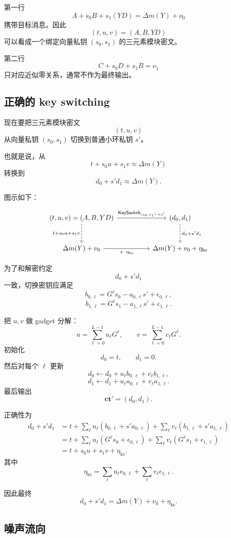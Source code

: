 \documentclass[11pt]{article}
\newcommand{\ct}{\mathbf{ct}}
\newcommand{\KS}{\mathsf{KeySwitch}}
\begin{document}
第一行
\[
A+s_0B+s_1(YD)=\Delta m(Y)+\nu_0
\]
携带目标消息。因此
\[
(t,u,v)=(A,B,YD)
\]
可以看成一个绑定向量私钥 $(s_0,s_1)$ 的三元素模块密文。

第二行
\[
C+s_0D+s_1B=\nu_1
\]
只对应近似零关系，通常不作为最终输出。

\subsection{正确的 key switching}

现在要把三元素模块密文
\[
(t,u,v)
\]
从向量私钥 $(s_0,s_1)$ 切换到普通小环私钥 $s'$。

也就是说，从
\[
t+s_0u+s_1v\approx \Delta m(Y)
\]
转换到
\[
d_0+s'd_1\approx \Delta m(Y).
\]

图示如下：

\[
\begin{tikzcd}[column sep=huge,row sep=large]
(t,u,v)=(A,B,YD)
  \arrow[d,dashed,"t+s_0u+s_1v"']
  \arrow[r,"\KS_{(s_0,s_1)\to s'}"]
&
(d_0,d_1)
  \arrow[d,dashed,"d_0+s'd_1"]
\\
\Delta m(Y)+\nu_0
  \arrow[r,"+\ \eta_{\mathrm{ks}}"']
&
\Delta m(Y)+\nu_0+\eta_{\mathrm{ks}}
\end{tikzcd}
\]

为了和解密约定
\[
d_0+s'd_1
\]
一致，切换密钥应满足
\[
b_{0,\ell}=G^\ell s_0-a_{0,\ell}s'+\epsilon_{0,\ell},
\]
\[
b_{1,\ell}=G^\ell s_1-a_{1,\ell}s'+\epsilon_{1,\ell}.
\]

把 $u,v$ 做 gadget 分解：
\[
u=\sum_{\ell=0}^{L-1}u_\ell G^\ell,
\qquad
v=\sum_{\ell=0}^{L-1}v_\ell G^\ell.
\]
初始化
\[
d_0=t,
\qquad
d_1=0.
\]
然后对每个 $\ell$ 更新
\[
d_0\leftarrow d_0+u_\ell b_{0,\ell}+v_\ell b_{1,\ell},
\]
\[
d_1\leftarrow d_1+u_\ell a_{0,\ell}+v_\ell a_{1,\ell}.
\]
最后输出
\[
\ct'=(d_0,d_1).
\]

正确性为
\[
\begin{aligned}
d_0+s'd_1
&=t+\sum_\ell u_\ell(b_{0,\ell}+s'a_{0,\ell})
     +\sum_\ell v_\ell(b_{1,\ell}+s'a_{1,\ell})\\
&=t+\sum_\ell u_\ell(G^\ell s_0+\epsilon_{0,\ell})
     +\sum_\ell v_\ell(G^\ell s_1+\epsilon_{1,\ell})\\
&=t+s_0u+s_1v+\eta_{\mathrm{ks}}.
\end{aligned}
\]
其中
\[
\eta_{\mathrm{ks}}
=
\sum_\ell u_\ell\epsilon_{0,\ell}
+
\sum_\ell v_\ell\epsilon_{1,\ell}.
\]

因此最终
\[
d_0+s'd_1=\Delta m(Y)+\nu_0+\eta_{\mathrm{ks}}.
\]

\subsection{噪声流向}
\end{document}
